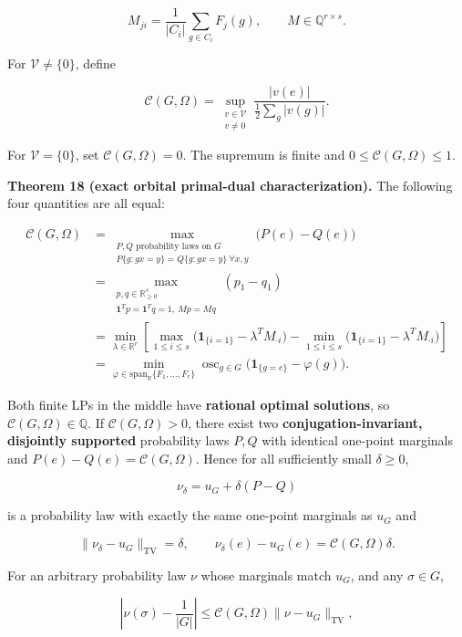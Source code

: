 \documentclass[
  11pt,
]{article}
\begin{document}
\[
M_{ji}=\frac1{|C_i|}\sum_{g\in C_i}F_j(g),\qquad
M\in\mathbb Q^{r\times s}. \tag{89}
\]

For \(\mathcal V\ne\{0\}\), define

\[
\mathcal C(G,\Omega)=\sup_{\substack{v\in\mathcal V\\v\ne0}}
\frac{|v(e)|}{\tfrac12\sum_g|v(g)|}. \tag{90}
\]

For \(\mathcal V=\{0\}\), set \(\mathcal C(G,\Omega)=0\). The supremum
is finite and \(0\le\mathcal C(G,\Omega)\le1\).

\textbf{Theorem 18 (exact orbital primal-dual characterization).} The
following four quantities are all equal:

\[
\begin{aligned}
\mathcal C(G,\Omega)
&=\max_{\substack{P,Q\text{ probability laws on }G\\
P\{g:gx=y\}=Q\{g:gx=y\}\ \forall x,y}}
\big(P(e)-Q(e)\big)\\
&=\max_{\substack{p,q\in\mathbb R_{\ge0}^{s}\\
\mathbf1^Tp=\mathbf1^Tq=1,\ Mp=Mq}}
(p_1-q_1)\\
&=\min_{\lambda\in\mathbb R^r}
\left[
\max_{1\le i\le s}\big(\mathbf1_{\{i=1\}}-\lambda^TM_{\cdot i}\big)
-\min_{1\le i\le s}\big(\mathbf1_{\{i=1\}}-\lambda^TM_{\cdot i}\big)
\right]\\
&=\min_{\varphi\in\mathrm{span}_{\mathbb R}\{F_1,\ldots,F_r\}}
\operatorname{osc}_{g\in G}\big(\mathbf1_{\{g=e\}}-\varphi(g)\big).
\end{aligned}\tag{91}
\]

Both finite LPs in the middle have \textbf{rational optimal solutions},
so \(\mathcal C(G,\Omega)\in\mathbb Q\). If \(\mathcal C(G,\Omega)>0\),
there exist two \textbf{conjugation-invariant, disjointly supported}
probability laws \(P,Q\) with identical one-point marginals and
\(P(e)-Q(e)=\mathcal C(G,\Omega)\). Hence for all sufficiently small
\(\delta\ge0\),

\[
\nu_\delta=u_G+\delta(P-Q) \tag{92}
\]

is a probability law with exactly the same one-point marginals as
\(u_G\) and

\[
\|\nu_\delta-u_G\|_{\mathrm{TV}}=\delta,\qquad
\nu_\delta(e)-u_G(e)=\mathcal C(G,\Omega)\delta. \tag{93}
\]

For an arbitrary probability law \(\nu\) whose marginals match \(u_G\),
and any \(\sigma\in G\),

\[
\left|\nu(\sigma)-\frac1{|G|}\right|
\le\mathcal C(G,\Omega)\|\nu-u_G\|_{\mathrm{TV}}, \tag{94}
\]
\end{document}
